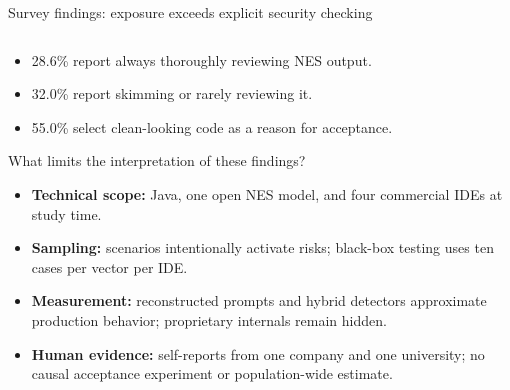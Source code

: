 \begin{frame}{Survey findings: exposure exceeds explicit security checking}
\begin{columns}[T]
\end{columns}
\bigskip
\vspace{7mm}
\begin{itemize}
\item 28.6\% report always thoroughly reviewing NES output.
\item 32.0\% report skimming or rarely reviewing it.
\item 55.0\% select clean-looking code as a reason for acceptance.
\end{itemize}
\end{frame}

\begin{frame}{What limits the interpretation of these findings?}
\begin{itemize}
\item \textbf{Technical scope:} Java, one open NES model, and four commercial IDEs at study time.
\item \textbf{Sampling:} scenarios intentionally activate risks; black-box testing uses ten cases per vector per IDE.
\item \textbf{Measurement:} reconstructed prompts and hybrid detectors approximate production behavior; proprietary internals remain hidden.
\item \textbf{Human evidence:} self-reports from one company and one university; no causal acceptance experiment or population-wide estimate.
\end{itemize}
\end{frame}
